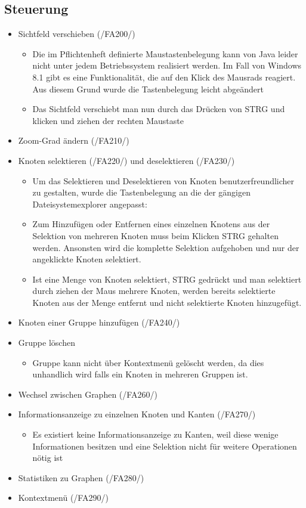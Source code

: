 \subsection{Steuerung}
\label{implkrit:steuerung}
\begin{itemize}
	\item Sichtfeld verschieben (/FA200/)
		\begin{itemize}
			\item Die im Pflichtenheft definierte Maustastenbelegung kann von Java leider nicht unter jedem Betriebssystem realisiert werden. Im Fall von Windows 8.1 gibt es eine Funktionalität, die auf den Klick des Mausrads reagiert. Aus diesem Grund wurde die Tastenbelegung leicht abgeändert
			\item Das Sichtfeld verschiebt man nun durch das Drücken von STRG und klicken und ziehen der rechten Maustaste
		\end{itemize}
	\item Zoom-Grad ändern (/FA210/)
	\item Knoten selektieren (/FA220/) und deselektieren (/FA230/)
		\begin{itemize}
			\item Um das Selektieren und Deselektieren von Knoten benutzerfreundlicher zu gestalten, wurde die Tastenbelegung an die der gängigen Dateisystemexplorer angepasst:
			\item Zum Hinzufügen oder Entfernen eines einzelnen Knotens aus der Selektion von mehreren Knoten muss beim Klicken STRG gehalten werden. Ansonsten wird die komplette Selektion aufgehoben und nur der angeklickte Knoten selektiert.
			\item Ist eine Menge von Knoten selektiert, STRG gedrückt und man selektiert durch ziehen der Maus mehrere Knoten, werden bereits selektierte Knoten aus der Menge entfernt und nicht selektierte Knoten hinzugefügt.
		\end{itemize}
	\item Knoten einer Gruppe hinzufügen (/FA240/)
	\item Gruppe löschen
		\begin{itemize}
			\item Gruppe kann nicht über Kontextmenü gelöscht werden, da dies unhandlich wird falls ein Knoten in mehreren Gruppen ist.
		\end{itemize}
	\item Wechsel zwischen Graphen (/FA260/)
	\item Informationsanzeige zu einzelnen Knoten und Kanten (/FA270/)
		\begin{itemize}
			\item Es existiert keine Informationsanzeige zu Kanten, weil diese wenige Informationen besitzen und eine Selektion nicht für weitere Operationen nötig ist
		\end{itemize}
	\item Statistiken zu Graphen (/FA280/)
	\item Kontextmenü (/FA290/)
\end{itemize}

